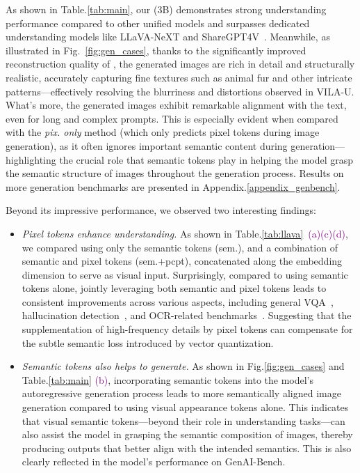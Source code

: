 As shown in Table.\ref{tab:main}, our \ours{} (3B) demonstrates strong understanding performance compared to other unified models and surpasses dedicated understanding models like LLaVA-NeXT and ShareGPT4V~\citep{chen2024sharegpt4v}.
Meanwhile, as illustrated in Fig.~\ref{fig:gen_cases}, thanks to the significantly improved reconstruction quality of \ours{}, the generated images are rich in detail and structurally realistic, accurately capturing fine textures such as animal fur and other intricate patterns---effectively resolving the blurriness and distortions observed in VILA-U.
What’s more, the generated images exhibit remarkable alignment with the text, even for long and complex prompts. This is especially evident when compared with the \textit{pix. only} method (which only predicts pixel tokens during image generation), as it often ignores important semantic content during generation---highlighting the crucial role that semantic tokens play in helping the model grasp the semantic structure of images throughout the generation process. Results on more generation benchmarks are presented in Appendix.\ref{appendix_genbench}.

Beyond its impressive performance, we observed two interesting findings:
\begin{itemize}[leftmargin=*]
    \item \emph{Pixel tokens enhance understanding.} As shown in Table.\ref{tab:llava}~\textcolor{purple}{(a)(c)(d)}, we compared using only the semantic tokens (sem.), and a combination of semantic and pixel tokens (sem.+pcpt), concatenated along the embedding dimension to serve as visual input. Surprisingly, compared to using semantic tokens alone, jointly leveraging both semantic and pixel tokens leads to consistent improvements across various aspects, including general VQA~\citep{liu2023mmbench,fu2024mme}, hallucination detection~\citep{POPE}, and OCR-related benchmarks~\citep{textvqa,liu2024ocrbench}. Suggesting that the supplementation of high-frequency details by pixel tokens can compensate for the subtle semantic loss introduced by vector quantization.
    \item \emph{Semantic tokens also helps to generate.} As shown in Fig.\ref{fig:gen_cases} and Table.\ref{tab:main} \textcolor{purple}{(b)}, incorporating semantic tokens into the model’s autoregressive generation process leads to more semantically aligned image generation compared to using visual appearance tokens alone. This indicates that visual semantic tokens—beyond their role in understanding tasks—can also assist the model in grasping the semantic composition of images, thereby producing outputs that better align with the intended semantics. This is also clearly reflected in the model’s performance on GenAI-Bench.
\end{itemize}

